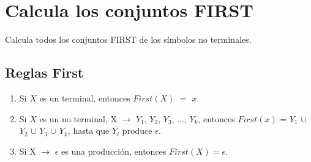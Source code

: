 \documentclass[12pt]{article}
\begin{document}
\section{Calcula los conjuntos FIRST}
Calcula todos los conjuntos FIRST de los símbolos no terminales.

\subsection{Reglas First}
\begin{enumerate}
    \item Si $X$ es un terminal, entonces $First(X)$ $=$ ${x}$
    \item Si $X$ es un no terminal, X $\rightarrow$ $Y_{1}$, $Y_{2}$, $Y_{3}$, ..., $Y_{k}$, entonces $First(x)$ = $Y_{1}$ $\cup$ $Y_{2}$ $\cup$ $Y_{3}$ $\cup$ $Y_{k}$, hasta que $Y_{i}$ produce $\epsilon$.
    \item Si X $\rightarrow$ $\epsilon$ es una producción, entonces $First(X) = \epsilon$.
\end{enumerate}
\end{document}
